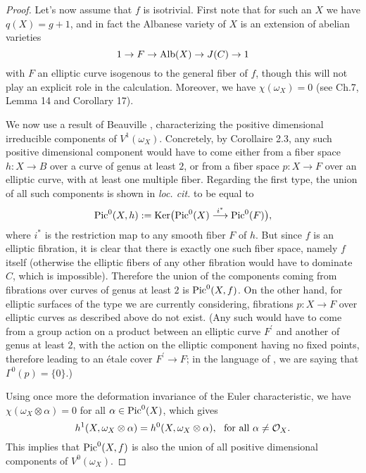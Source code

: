 \documentclass{amsart}
\theoremstyle{plain}
\theoremstyle{definition}
\numberwithin{equation}{section}
\begin{document}
\begin{proof}
Let's now assume that $f$ is isotrivial. 
First note that for such an $X$ we have $q (X) = g + 1$, and in fact the Albanese variety of $X$ is an extension of abelian varieties 
$$ 1 \rightarrow F \rightarrow {\rm Alb} (X) \rightarrow J (C) \rightarrow 1$$
with $F$ an elliptic curve isogenous to the general fiber of $f$, though this will not play an explicit role in the calculation. Moreover, we have $\chi (\omega_X) = 0$ (see \cite{friedman} Ch.7, Lemma 14 and Corollary 17).

We now use a result of Beauville \cite{beauville2} \cite{beauville3}, characterizing the positive dimensional irreducible 
components of  $V^1 (\omega_X)$. Concretely, by \cite{beauville3} Corollaire 2.3, any such positive dimensional component would have to come either from a fiber space $h: X \rightarrow B$ over a curve of genus at least $2$, or from a fiber space 
$p: X \rightarrow F$ over an elliptic curve, with at least one multiple fiber.
Regarding the first type, the union of all such components
is shown in \emph{loc. cit.} to be equal to 
$${\rm Pic}^0 (X, h) : = {\rm Ker} \big({\rm Pic}^0 (X) \overset{i^*}{\longrightarrow} {\rm Pic}^0 (F)\big),$$
where $i^*$ is the restriction map to any smooth fiber $F$ of $h$. 
But since $f$ is an elliptic fibration, it is clear that there is exactly one such fiber space, namely $f$ itself 
(otherwise the elliptic fibers of any other fibration would have to dominate $C$, which is impossible). Therefore the
union of the components coming from fibrations over curves of genus at least $2$ is ${\rm Pic}^0 (X, f)$.
On the other hand,  for elliptic surfaces of the  type we are currently considering,  fibrations $p: X \rightarrow F$ over elliptic curves 
as described above do not exist. (Any such 
would have to come from a group action on a product between an elliptic curve $F^\prime$ and another of genus at least $2$, with the action on the elliptic component having no fixed points, therefore leading to an \'etale cover $F^\prime\rightarrow F$; in the language of \cite{beauville3}, we are saying that $\Gamma^0 (p) = \{0\}$.) 

Using once more the deformation invariance of the Euler characteristic, we have 
$\chi (\omega_X\otimes \alpha) = 0$ for all $\alpha \in {\rm Pic}^0 (X)$, which gives
\begin{equation}\label{nonzero}
h^1 (X, \omega_X \otimes \alpha) = h^0 (X, \omega_X \otimes \alpha), \,\,\,\, {\rm for~all~} \alpha \neq {{\mathcal O}}_X.
\end{equation}
This implies that ${\rm Pic}^0 (X, f)$ is also the union of all positive dimensional components of 
$V^0 (\omega_X)$. 


\end{proof}
\end{document}
